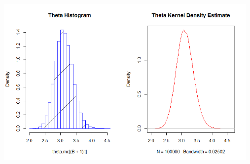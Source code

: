 \documentclass[10pt,a4paper]{article}
\begin{document}
\centerline{\includegraphics[width=13cm,height=13cm,keepaspectratio]{./images/21}}
\end{document}
